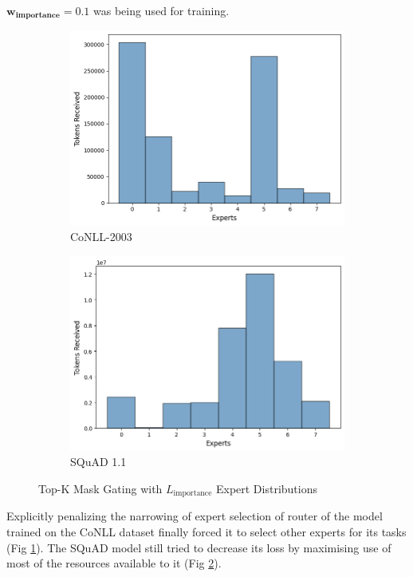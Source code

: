 \documentclass[12pt]{article}
\begin{document}
$\boldsymbol{w_{\text{importance}}=0.1}$ was being used for training.
\begin{figure}[h]
\centering
\begin{subfigure}{.5\textwidth}
  \centering
  \includegraphics[width=1\linewidth]{report_images/conll/importance.png}
  \caption{CoNLL-2003}
  \label{fig:importance_conll}
\end{subfigure}%
\begin{subfigure}{.5\textwidth}
  \centering
  \includegraphics[width=1\linewidth]{report_images/squad/importance.png}
  \caption{SQuAD 1.1}
  \label{fig:importance_squad}
\end{subfigure}
\caption{Top-K Mask Gating with $L_{\text{importance}}$ Expert Distributions}
\label{fig:importance}
\end{figure}
\FloatBarrier
\noindent
Explicitly penalizing the narrowing of expert selection of router of the model trained on the CoNLL dataset finally forced it to select other experts for its tasks (Fig \ref{fig:importance_conll}). The SQuAD model still tried to decrease its loss by maximising use of most of the resources available to it (Fig \ref{fig:importance_squad}).
\end{document}
